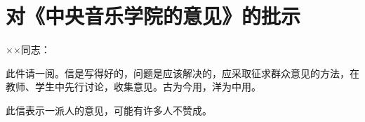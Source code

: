 \section[对《中央音乐学院的意见》的批示（一九六四年九月二十七日）]{对《中央音乐学院的意见》的批示}


××同志：

此件请一阅。信是写得好的，问题是应该解决的，应采取征求群众意见的方法，在教师、学生中先行讨论，收集意见。古为今用，洋为中用。

此信表示一派人的意见，可能有许多人不赞成。

